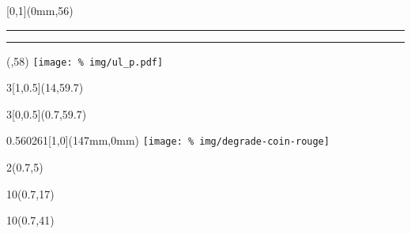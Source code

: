\begin{frame}[plain]
  \begin{textblock*}{\paperwidth}[0,1](0mm,56\TPVertModule)
    \textcolor{rouge}{\rule{\banderougewidth}{\banderougeheight}}%
    \textcolor{or}{\rule{\bandeorwidth}{\bandeorheight}}           %
  \end{textblock*}

  \begin{textblock*}{\bandeorwidth}(\banderougewidth,58\TPVertModule)
    \texttt{[image: \%
      img/ul\_p.pdf]}
  \end{textblock*}
  \begin{textblock*}{3\TPHorizModule}[1,0.5](14\TPHorizModule,59.7\TPVertModule)
    \raggedleft\fsgiid
  \end{textblock*}
  \begin{textblock*}{3\TPHorizModule}[0,0.5](0.7\TPHorizModule,59.7\TPVertModule)
		\iidurl
	\end{textblock*}


  \begin{textblock*}{0.560261\imageheight}[1,0](147mm,0mm)
    \texttt{[image: \%
      img/degrade-coin-rouge]}
  \end{textblock*}

  \begin{textblock*}{2\TPHorizModule}(0.7\TPHorizModule,5\TPVertModule)
    \textcolor[rgb]{0.37,0.37,0.37}{\webinaire}
  \end{textblock*}

  \begin{textblock*}{10\TPHorizModule}(0.7\TPHorizModule,17\TPVertModule)
    \textcolor[cmyk]{0.67, 0.66, 0, 0.71}{\titlefmt}
  \end{textblock*}

  \begin{textblock*}{10\TPHorizModule}(0.7\TPHorizModule,41\TPVertModule)
    \textcolor[rgb]{0.37,0.37,0.37}{\datefmt}
  \end{textblock*}
\end{frame}
\endgroup
